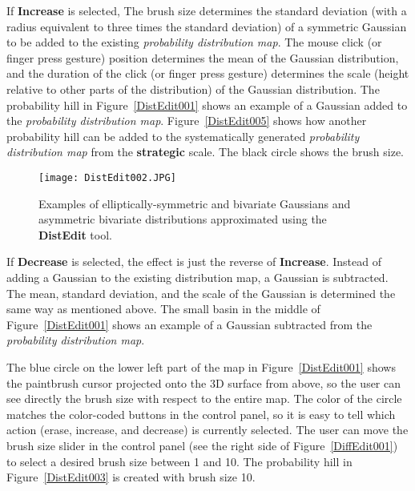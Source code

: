 If \textbf{Increase} is selected, The brush size determines the standard deviation (with a radius equivalent to three times the standard deviation) of a symmetric Gaussian to be added to the existing \textit{probability distribution map}. The mouse click (or finger press gesture) position determines the mean of the Gaussian distribution, and the duration of the click (or finger press gesture) determines the scale (height relative to other parts of the distribution) of the Gaussian distribution. The probability hill in Figure~\ref{DistEdit001} shows an example of a Gaussian added to the \textit{probability distribution map}. Figure~\ref{DistEdit005} shows how another probability hill can be added to the systematically generated \textit{probability distribution map} from the \textbf{strategic} scale. The black circle shows the brush size.

\begin{figure}
\centering
\texttt{[image: DistEdit002.JPG]}
\caption[Examples of elliptically-symmetric and asymmetric bivariate distributions]{Examples of elliptically-symmetric and bivariate Gaussians and asymmetric bivariate distributions approximated using the \textbf{DistEdit} tool.}
\label{DistEdit002}
\end{figure}

If \textbf{Decrease} is selected, the effect is just the reverse of \textbf{Increase}. Instead of adding a Gaussian to the existing distribution map, a Gaussian is subtracted. The mean, standard deviation, and the scale of the Gaussian is determined the same way as mentioned above. The small basin in the middle of Figure~\ref{DistEdit001} shows an example of a Gaussian subtracted from the \textit{probability distribution map}.

The blue circle on the lower left part of the map in Figure~\ref{DistEdit001} shows the paintbrush cursor projected onto the 3D surface from above, so the user can see directly the brush size with respect to the entire map. The color of the circle matches the color-coded buttons in the control panel, so it is easy to tell which action (erase, increase, and decrease) is currently selected. The user can move the brush size slider in the control panel (see the right side of Figure~\ref{DiffEdit001}) to select a desired brush size between 1 and 10. The probability hill in Figure~\ref{DistEdit003} is created with brush size 10.

